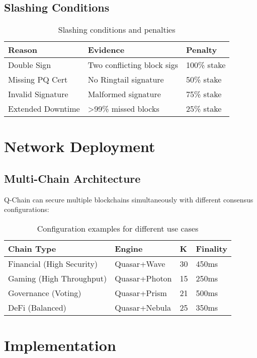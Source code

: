 \documentclass[11pt]{article}
\begin{document}
\subsection{Slashing Conditions}

\begin{table}[h]
\centering
\begin{tabular}{@{}lll@{}}
\toprule
\textbf{Reason} & \textbf{Evidence} & \textbf{Penalty} \\
\midrule
Double Sign & Two conflicting block sigs & 100\% stake \\
Missing PQ Cert & No Ringtail signature & 50\% stake \\
Invalid Signature & Malformed signature & 75\% stake \\
Extended Downtime & >99\% missed blocks & 25\% stake \\
\bottomrule
\end{tabular}
\caption{Slashing conditions and penalties}
\label{tab:slashing}
\end{table}

\section{Network Deployment}

\subsection{Multi-Chain Architecture}

Q-Chain can secure multiple blockchains simultaneously with different consensus configurations:

\begin{table}[h]
\centering
\small
\begin{tabular}{@{}llll@{}}
\toprule
\textbf{Chain Type} & \textbf{Engine} & \textbf{K} & \textbf{Finality} \\
\midrule
Financial (High Security) & Quasar+Wave & 30 & 450ms \\
Gaming (High Throughput) & Quasar+Photon & 15 & 250ms \\
Governance (Voting) & Quasar+Prism & 21 & 500ms \\
DeFi (Balanced) & Quasar+Nebula & 25 & 350ms \\
\bottomrule
\end{tabular}
\caption{Configuration examples for different use cases}
\label{tab:configurations}
\end{table}

\section{Implementation}
\end{document}
